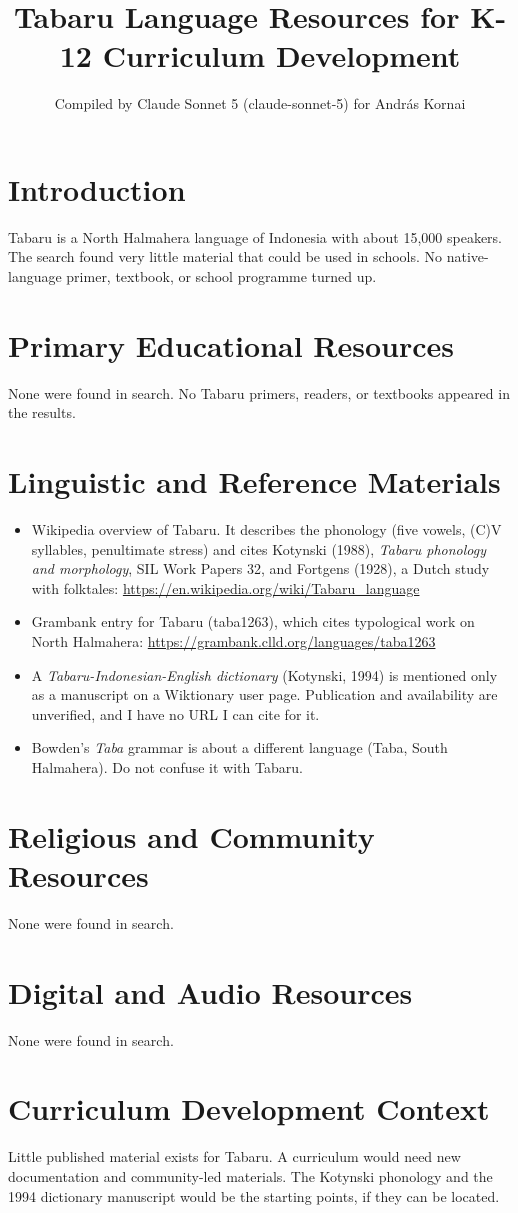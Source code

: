 \documentclass[12pt]{article}
\title{Tabaru Language Resources for K-12 Curriculum Development}
\author{Compiled by Claude Sonnet 5 (claude-sonnet-5) for Andr\'as Kornai}
\date{}
\begin{document}
\maketitle

\section{Introduction}
Tabaru is a North Halmahera language of Indonesia with about 15,000 speakers. The search found very little material that could be used in schools. No native-language primer, textbook, or school programme turned up.

\section{Primary Educational Resources}
None were found in search. No Tabaru primers, readers, or textbooks appeared in the results.

\section{Linguistic and Reference Materials}
\begin{itemize}
\item Wikipedia overview of Tabaru. It describes the phonology (five vowels, (C)V syllables, penultimate stress) and cites Kotynski (1988), \emph{Tabaru phonology and morphology}, SIL Work Papers 32, and Fortgens (1928), a Dutch study with folktales: \url{https://en.wikipedia.org/wiki/Tabaru_language}
\item Grambank entry for Tabaru (taba1263), which cites typological work on North Halmahera: \url{https://grambank.clld.org/languages/taba1263}
\item A \emph{Tabaru-Indonesian-English dictionary} (Kotynski, 1994) is mentioned only as a manuscript on a Wiktionary user page. Publication and availability are unverified, and I have no URL I can cite for it.
\item Bowden's \emph{Taba} grammar is about a different language (Taba, South Halmahera). Do not confuse it with Tabaru.
\end{itemize}

\section{Religious and Community Resources}
None were found in search.

\section{Digital and Audio Resources}
None were found in search.

\section{Curriculum Development Context}
Little published material exists for Tabaru. A curriculum would need new documentation and community-led materials. The Kotynski phonology and the 1994 dictionary manuscript would be the starting points, if they can be located.
\end{document}
